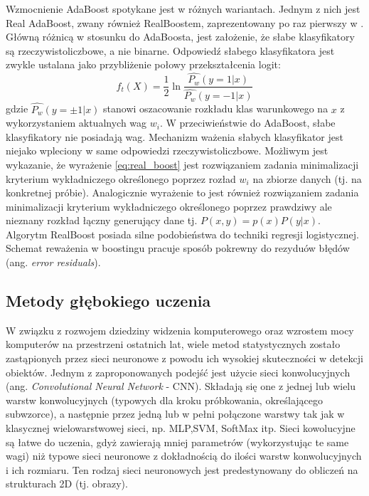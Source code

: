 Wzmocnienie AdaBoost spotykane jest w różnych wariantach.
Jednym z nich jest Real AdaBoost, zwany również RealBoostem, zaprezentowany po raz pierwszy w \cite{10.1023/A:1007614523901}.
Główną różnicą w stosunku do AdaBoosta, jest założenie, że słabe klasyfikatory są rzeczywistoliczbowe, a nie binarne.
Odpowiedź słabego klasyfikatora jest zwykle ustalana jako przybliżenie połowy przekształcenia logit:
\begin{equation}
    \label{eq:real_boost}
    f_t(X) =\dfrac{1}{2}\ln\dfrac{\hat{P_w}(y=1|x)}{\hat{P_w}(y=-1|x)}
\end{equation}
gdzie $\hat{P_w}(y=\pm1|x)$ stanowi oszacowanie rozkładu klas warunkowego na $x$ z wykorzystaniem aktualnych wag $w_i$.
W przeciwieństwie do AdaBoost, słabe klasyfikatory nie posiadają wag.
Mechanizm ważenia słabych klasyfikator jest niejako wpleciony w same odpowiedzi rzeczywistoliczbowe.
Możliwym jest wykazanie, że wyrażenie \ref{eq:real_boost} jest rozwiązaniem zadania minimalizacji kryterium wykładniczego określonego poprzez rozład ${w_i}$ na zbiorze danych (tj. na konkretnej próbie).
Analogicznie wyrażenie to jest również rozwiązaniem zadania minimalizacji kryterium wykładniczego określonego poprzez prawdziwy ale nieznany rozkład łączny generujący dane tj. $P(x,y)=p(x)P(y|x)$.
Algorytm RealBoost posiada silne podobieństwa do techniki regresji logistycznej.
Schemat reważenia w boostingu pracuje sposób pokrewny do rezyduów błędów (ang. \textit{error residuals}).

\subsection{Metody głębokiego uczenia}
W związku z rozwojem dziedziny widzenia komputerowego oraz wzrostem mocy komputerów na przestrzeni ostatnich lat, wiele metod statystycznych zostało zastąpionych przez sieci neuronowe z powodu ich wysokiej skuteczności w detekcji obiektów.
Jednym z zaproponowanych podejść jest użycie sieci konwolucyjnych (ang. \textit{Convolutional Neural Network} - CNN)\cite{cnn_detector}.
Składają się one z jednej lub wielu warstw konwolucyjnych (typowych dla kroku próbkowania, określającego subwzorce), a następnie przez jedną lub w pełni połączone warstwy tak jak w klasycznej wielowarstwowej sieci, np. MLP,SVM, SoftMax itp.
Sieci kowolucyjne są łatwe do uczenia, gdyż zawierają mniej parametrów (wykorzystując te same wagi) niż typowe sieci neuronowe z dokładnością do ilości warstw konwolucyjnych i ich rozmiaru.
Ten rodzaj sieci neuronowych jest predestynowany do obliczeń na strukturach 2D (tj. obrazy).

